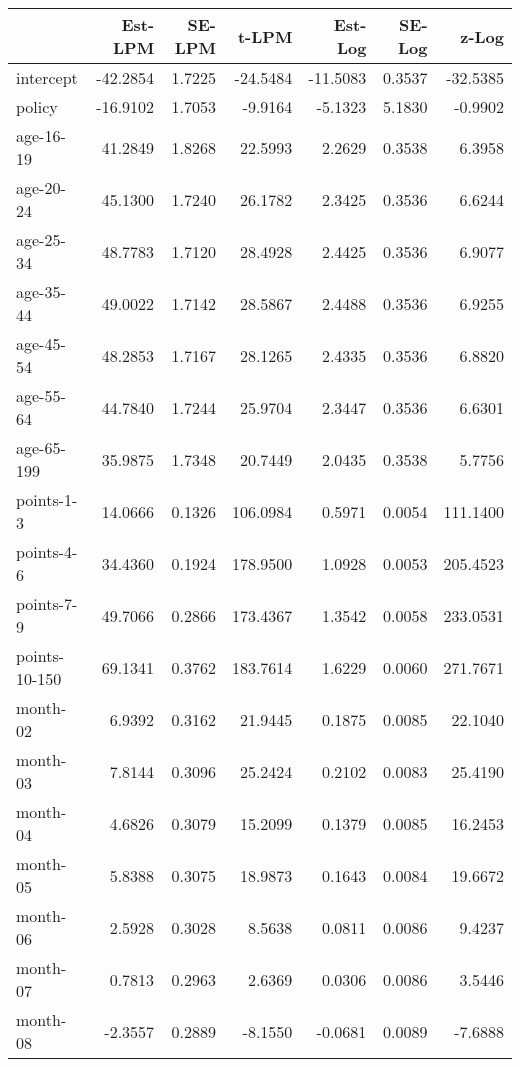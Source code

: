 \documentclass[10pt]{article}
\begin{document}

\begin{table}[ht]
\centering
\begin{tabular}{lrrrrrr}
  \hline
 & Est-LPM & SE-LPM & t-LPM & Est-Log & SE-Log & z-Log \\ 
  \hline
intercept & -42.2854 & 1.7225 & -24.5484 & -11.5083 & 0.3537 & -32.5385 \\ 
  policy & -16.9102 & 1.7053 & -9.9164 & -5.1323 & 5.1830 & -0.9902 \\ 
  age-16-19 & 41.2849 & 1.8268 & 22.5993 & 2.2629 & 0.3538 & 6.3958 \\ 
  age-20-24 & 45.1300 & 1.7240 & 26.1782 & 2.3425 & 0.3536 & 6.6244 \\ 
  age-25-34 & 48.7783 & 1.7120 & 28.4928 & 2.4425 & 0.3536 & 6.9077 \\ 
  age-35-44 & 49.0022 & 1.7142 & 28.5867 & 2.4488 & 0.3536 & 6.9255 \\ 
  age-45-54 & 48.2853 & 1.7167 & 28.1265 & 2.4335 & 0.3536 & 6.8820 \\ 
  age-55-64 & 44.7840 & 1.7244 & 25.9704 & 2.3447 & 0.3536 & 6.6301 \\ 
  age-65-199 & 35.9875 & 1.7348 & 20.7449 & 2.0435 & 0.3538 & 5.7756 \\ 
  points-1-3 & 14.0666 & 0.1326 & 106.0984 & 0.5971 & 0.0054 & 111.1400 \\ 
  points-4-6 & 34.4360 & 0.1924 & 178.9500 & 1.0928 & 0.0053 & 205.4523 \\ 
  points-7-9 & 49.7066 & 0.2866 & 173.4367 & 1.3542 & 0.0058 & 233.0531 \\ 
  points-10-150 & 69.1341 & 0.3762 & 183.7614 & 1.6229 & 0.0060 & 271.7671 \\ 
  month-02 & 6.9392 & 0.3162 & 21.9445 & 0.1875 & 0.0085 & 22.1040 \\ 
  month-03 & 7.8144 & 0.3096 & 25.2424 & 0.2102 & 0.0083 & 25.4190 \\ 
  month-04 & 4.6826 & 0.3079 & 15.2099 & 0.1379 & 0.0085 & 16.2453 \\ 
  month-05 & 5.8388 & 0.3075 & 18.9873 & 0.1643 & 0.0084 & 19.6672 \\ 
  month-06 & 2.5928 & 0.3028 & 8.5638 & 0.0811 & 0.0086 & 9.4237 \\ 
  month-07 & 0.7813 & 0.2963 & 2.6369 & 0.0306 & 0.0086 & 3.5446 \\ 
  month-08 & -2.3557 & 0.2889 & -8.1550 & -0.0681 & 0.0089 & -7.6888 \\ 

\end{tabular}
\end{table}
\end{document}
